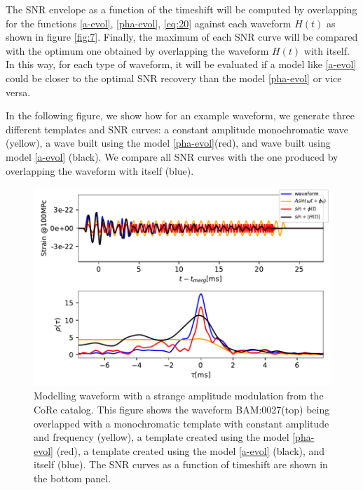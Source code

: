 The SNR envelope as a function of the timeshift will be computed by overlapping for the functions \ref{a-evol}, \ref{pha-evol}, \ref{eq:20} against each waveform $H(t)$ as shown in figure \ref{fig:7}. Finally, the maximum of each SNR curve will be compared with the optimum one obtained by overlapping the waveform $H(t)$ with itself. In this way, for each type of waveform, it will be evaluated if a model like \ref{a-evol} could be closer to the optimal SNR recovery than the model \ref{pha-evol} or vice versa.

In the following figure, we show how for an example waveform, we generate three different templates and SNR curves: a constant amplitude monochromatic wave (yellow), a wave built using the model \ref{pha-evol}(red), and wave built using model \ref{a-evol} (black). We compare all SNR curves with the one produced by overlapping the waveform with itself (blue).

\begin{figure}[hbt!]
\begin{center}
\includegraphics[width=\textwidth, angle=0]{images/Data_analysis/results/phi-A0.pdf}
\captionsetup{width=0.8\textwidth}
\caption[Modelling waveform with a strange amplitude modulation from the CoRe catalog]{Modelling waveform with a strange amplitude modulation from the CoRe catalog. This figure shows the waveform BAM:0027(top) \cite{Dietrich:2018phi} being overlapped with a monochromatic template with constant amplitude and frequency (yellow), a template created using the model \ref{pha-evol} (red), a template created using the model \ref{a-evol} (black), and itself (blue). The SNR curves as a function of timeshift are shown in the bottom panel.}
\label{analysis}
\end{center}
\end{figure}
\FloatBarrier

